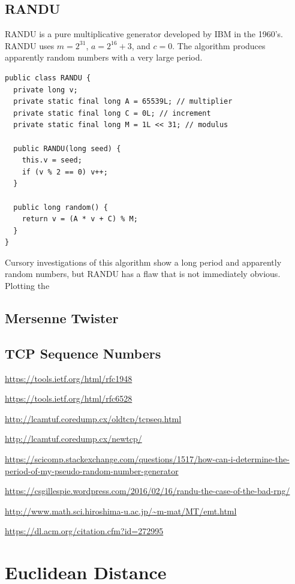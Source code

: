 \documentclass{book}
\begin{document}
\section{RANDU}

RANDU is a pure multiplicative generator developed by IBM in the 1960's. RANDU uses $m=2^{31}$, $a=2^{16}+3$, and $c=0$. The algorithm produces apparently random numbers with a very large period.

\begin{lstlisting}[caption={The RANDU PRNG implemented in Java}]
public class RANDU {
  private long v;
  private static final long A = 65539L; // multiplier
  private static final long C = 0L; // increment
  private static final long M = 1L << 31; // modulus

  public RANDU(long seed) {
    this.v = seed;
    if (v % 2 == 0) v++;
  }

  public long random() {
    return v = (A * v + C) % M;
  }
}
\end{lstlisting}

Cursory investigations of this algorithm show a long period and apparently random numbers, but RANDU has a flaw that is not immediately obvious. Plotting the 

\section{Mersenne Twister}



\section{TCP Sequence Numbers}


\url{https://tools.ietf.org/html/rfc1948}

\url{https://tools.ietf.org/html/rfc6528}

\url{http://lcamtuf.coredump.cx/oldtcp/tcpseq.html}

\url{http://lcamtuf.coredump.cx/newtcp/}

\url{https://scicomp.stackexchange.com/questions/1517/how-can-i-determine-the-period-of-my-pseudo-random-number-generator}

\url{https://csgillespie.wordpress.com/2016/02/16/randu-the-case-of-the-bad-rng/}

\url{http://www.math.sci.hiroshima-u.ac.jp/~m-mat/MT/emt.html}

\url{https://dl.acm.org/citation.cfm?id=272995}

\chapter{Euclidean Distance}
\end{document}

